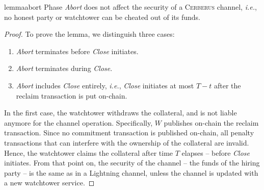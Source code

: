 \documentclass[runningheads]{llncs}
\newcommand{\ie}{{\em i.e.}}
\newcommand{\sys}{\textsc{Cerberus}\xspace}
\begin{document}
\vspace{-4pt}
\begin{restatable}{lemma}{abort}\label{lem:abort}
Phase \textit{Abort} does not affect the security of a \sys channel, \ie, no honest party or watchtower can be cheated out of its funds.
\end{restatable}
\begin{proof}
To prove the lemma, we distinguish three cases:
\begin{enumerate}[label=(\alph*)]
    \item \textit{Abort} terminates before \textit{Close} initiates.
    \item \textit{Abort} terminates during \textit{Close}.
    \item \textit{Abort} includes \textit{Close} entirely, \ie, \textit{Close} initiates at most $T-t$ after the reclaim transaction is put on-chain.
\end{enumerate}

In the first case, the watchtower withdraws the collateral, and is not liable anymore for the channel operation.
Specifically, $W$ publishes on-chain the reclaim transaction. Since no commitment transaction is published on-chain, all penalty transactions that can interfere with the ownership of the collateral are invalid. Hence, the watchtower claims the collateral after time $T$ elapses -- before  \textit{Close} initiates.
From that point on, the security of the channel -- the funds of the hiring party -- is the same as in a Lightning channel, unless the channel is updated with a new watchtower service.


\end{proof}
\end{document}

